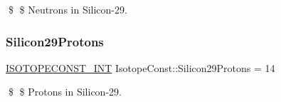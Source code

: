\$ \$ Neutrons in Silicon-\/29. \mbox{\label{group___isotope_const-_silicon-_si29_ga3e955405ebeab6a603b1e450aa6a5d2c}} 
\subsubsection{\texorpdfstring{Silicon29\+Protons}{Silicon29Protons}}
{\footnotesize\ttfamily \mbox{\hyperlink{group___isotope_const-_macros_ga5f18360b3e99483a35c32d789e62621c}{I\+S\+O\+T\+O\+P\+E\+C\+O\+N\+S\+T\+\_\+\+I\+NT}} Isotope\+Const\+::\+Silicon29\+Protons = 14}

\$ \$ Protons in Silicon-\/29. 